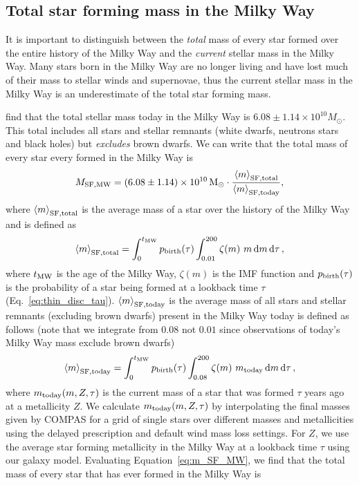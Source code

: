 \subsection{Total star forming mass in the Milky Way}
It is important to distinguish between the \textit{total} mass of every star formed over the entire history of the Milky Way and the \textit{current} stellar mass in the Milky Way. Many stars born in the Milky Way are no longer living and have lost much of their mass to stellar winds and supernovae, thus the current stellar mass in the Milky Way is an underestimate of the total star forming mass.

\citet{Licquia+2015} find that the total stellar mass today in the Milky Way is $6.08 \pm 1.14 \times 10^{10} \unit{M_{\odot}}$. This total includes all stars and stellar remnants (white dwarfs, neutrons stars and black holes) but \textit{excludes} brown dwarfs. We can write that the total mass of every star every formed in the Milky Way is
\begin{equation}\label{eq:m_SF_MW}
    M_{\rm SF, MW} = (6.08 \pm 1.14) \times 10^{10} \unit{M_{\rm \odot}} \cdot \frac{\avg{m}_{\rm SF, total}}{\avg{m}_{\rm SF, today}},
\end{equation}
where $\left\langle m\right\rangle_{\rm SF, total}$ is the average mass of a star over the history of the Milky Way and is defined as
\begin{equation}
    \avg{m}_{\rm SF, total} = \int_{0}^{t_{\rm MW}} p_{\rm birth}(\tau) \int_{0.01}^{200} \zeta(m)\ m \dd{m} \dd{\tau},
\end{equation}
where $t_{\rm MW}$ is the age of the Milky Way, $\zeta(m)$ is the \citet{Kroupa+2001} IMF function and $p_{\rm birth}(\tau)$ is the probability of a star being formed at a lookback time $\tau$ (Eq.~\ref{eq:thin_disc_tau}). $\left\langle m\right\rangle_{\rm SF, today}$ is the average mass of all stars and stellar remnants (excluding brown dwarfs) present in the Milky Way today is defined as follows (note that we integrate from $0.08$ not $0.01$ since observations of today's Milky Way mass exclude brown dwarfs)
\begin{equation}
    \avg{m}_{\rm SF, today} = \int_{0}^{t_{\rm MW}} p_{\rm birth}(\tau) \int_{0.08}^{200} \zeta(m)\ m_{\rm today} \dd{m} \dd{\tau},
\end{equation}
where $m_{\rm today}(m, Z, \tau)$ is the current mass of a star that was formed $\tau$ years ago at a metallicity $Z$. We calculate $m_{\rm today}(m, Z, \tau)$ by interpolating the final masses given by COMPAS for a grid of single stars over different masses and metallicities using the \citet{Fryer+2012} delayed prescription and default wind mass loss settings. For $Z$, we use the average star forming metallicity in the Milky Way at a lookback time $\tau$ using our galaxy model. Evaluating Equation~\ref{eq:m_SF_MW}, we find that the total mass of every star that has ever formed in the Milky Way is

